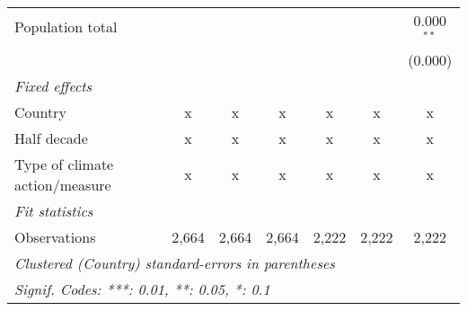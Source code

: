 \begin{tabular}{lcccccc}
   Population total                           &         &               &               &               &               & 0.000$^{**}$\\   
                                              &         &               &               &               &               & (0.000)\\   
   \emph{Fixed effects}\\
   Country                                    & x       & x             & x             & x             & x             & x\\  
   Half decade                                & x       & x             & x             & x             & x             & x\\  
   Type of climate action/measure             & x       & x             & x             & x             & x             & x\\  
   \midrule \emph{Fit statistics}\\
   Observations                               & 2,664   & 2,664         & 2,664         & 2,222         & 2,222         & 2,222\\  
   \midrule
   \multicolumn{7}{l}{\emph{Clustered (Country) standard-errors in parentheses}}\\
   \multicolumn{7}{l}{\emph{Signif. Codes: ***: 0.01, **: 0.05, *: 0.1}}\\
\end{tabular}
\par\endgroup


